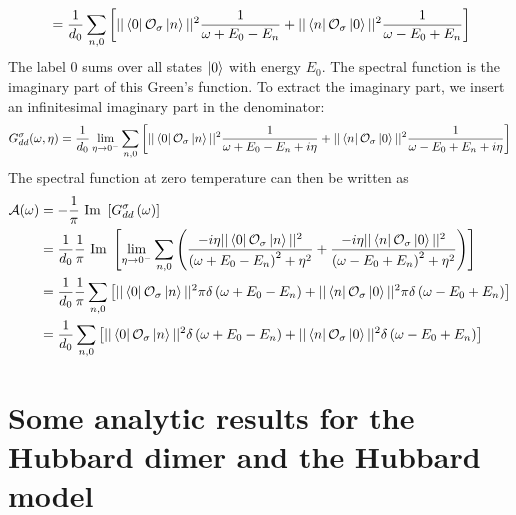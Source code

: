 \documentclass{report}
\numberwithin{equation}{section}
\begin{document}
\begin{appendices}
\begin{equation}
\begin{aligned}
						 &= \frac{1}{d_0}\sum_{n,0}\left[||\bra{0}\mathcal{O}_{\sigma}\ket{n}||^2\frac{1}{\omega + E_0 - E_n} + ||\bra{n}\mathcal{O}_{\sigma}\ket{0}||^2\frac{1}{\omega - E_0 + E_n}\right]\\
\end{aligned}\end{equation}
The label 0 sums over all states \(\ket{0}\) with energy \(E_0\). The spectral function is the imaginary part of this Green's function. To extract the imaginary part, we insert an infinitesimal imaginary part in the denominator:
\begin{equation}\begin{aligned}
	G_{d d}^\sigma(\omega, \eta) = \frac{1}{d_0}\lim_{\eta \to 0^-}\sum_{n,0}\left[||\bra{0}\mathcal{O}_{\sigma}\ket{n}||^2\frac{1}{\omega + E_0 - E_n + i\eta} + ||\bra{n}\mathcal{O}_{\sigma}\ket{0}||^2\frac{1}{\omega - E_0 + E_n + i\eta}\right]\\
\end{aligned}\end{equation}
The spectral function at zero temperature can then be written as
\begin{equation}\begin{aligned}
	\mathcal{A(\omega)} &= -\frac{1}{\pi}\text{ Im }\left[G_{dd}^\sigma\left( \omega \right) \right] \\
			    &= \frac{1}{d_0}\frac{1}{\pi}\text{ Im }\left[\lim_{\eta \to 0^-}\sum_{n,0}\left(\frac{-i\eta ||\bra{0}\mathcal{O}_{\sigma}\ket{n}||^2}{\left(\omega + E_0 - E_n\right)^2 + \eta^2} + \frac{-i\eta ||\bra{n}\mathcal{O}_{\sigma}\ket{0}||^2}{\left(\omega - E_0 + E_n\right)^2 + \eta^2}\right)\right]\\
			    &= \frac{1}{d_0}\frac{1}{\pi}\sum_{n,0}\left[||\bra{0}\mathcal{O}_{\sigma}\ket{n}||^2\pi\delta\left(\omega + E_0 - E_n\right) + ||\bra{n}\mathcal{O}_{\sigma}\ket{0}||^2\pi\delta\left(\omega - E_0 + E_n\right)\right]\\
			    &= \frac{1}{d_0}\sum_{n,0}\left[||\bra{0}\mathcal{O}_{\sigma}\ket{n}||^2\delta\left(\omega + E_0 - E_n\right) + ||\bra{n}\mathcal{O}_{\sigma}\ket{0}||^2\delta\left(\omega - E_0 + E_n\right)\right]\\
\end{aligned}\end{equation}

\chapter{Some analytic results for the Hubbard dimer and the Hubbard model}

\end{appendices}
\end{document}
